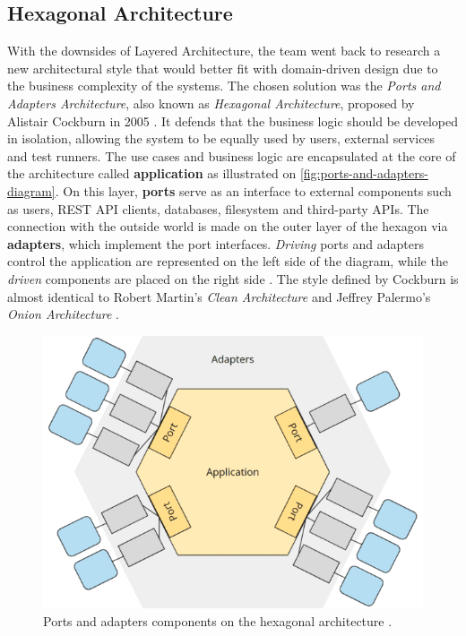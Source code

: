 \subsection{Hexagonal Architecture}
\label{sec:ports-and-adapters}

With the downsides of Layered Architecture, the team went back to research a new architectural style that would better fit with domain-driven design due to the business complexity of the systems. The chosen solution was the \textit{Ports and Adapters Architecture}, also known as \textit{Hexagonal Architecture}, proposed by Alistair Cockburn in 2005 \cite{alistair-cockburn-hexagonal-architecture}. It defends that the business logic should be developed in isolation, allowing the system to be equally used by users, external services and test runners. The use cases and business logic are encapsulated at the core of the architecture called \textbf{application} as illustrated on \autoref{fig:ports-and-adapters-diagram}. On this layer, \textbf{ports} serve as an interface to external components such as users, REST API clients, databases, filesystem and third-party APIs. The connection with the outside world is made on the outer layer of the hexagon via \textbf{adapters}, which implement the port interfaces. \textit{Driving} ports and adapters control the application are represented on the left side of the diagram, while the \textit{driven} components are placed on the right side \cite{sven-woltmann-hexagonal-architecture}. The style defined by Cockburn is almost identical to Robert Martin's \textit{Clean Architecture} \cite{robert-martin-clean-architecture-book} and Jeffrey Palermo's \textit{Onion Architecture} \cite{onion-architecture-article}.

\begin{figure}[htbp]
  \centering
  \includegraphics[scale=0.5]{Imagens/chap04/ports-and-adapters-diagram.png}
  \caption{Ports and adapters components on the hexagonal architecture \cite{sven-woltmann-hexagonal-architecture}.}
  \label{fig:ports-and-adapters-diagram}
\end{figure}


